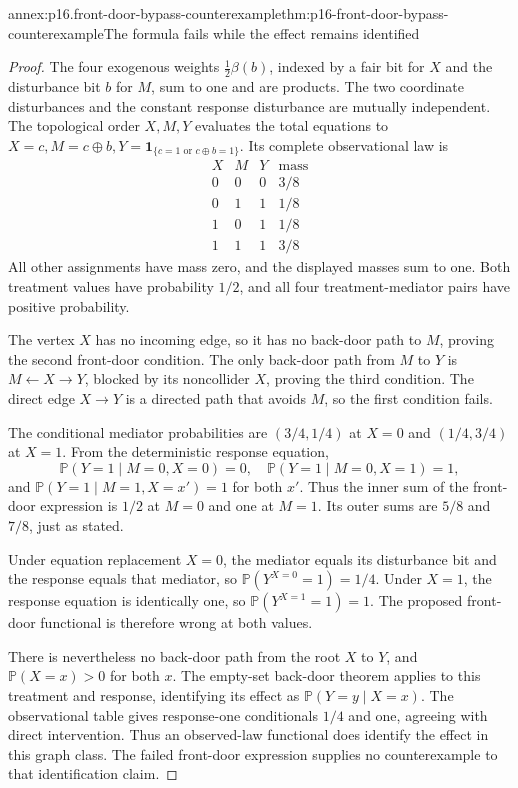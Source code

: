 \begin{annexitem}{annex:p16.front-door-bypass-counterexample}{thm:p16-front-door-bypass-counterexample}{The formula fails while the effect remains identified}
\begin{proof}
The four exogenous weights \(\frac12\beta(b)\), indexed by a
fair bit for \(X\) and the disturbance bit \(b\) for \(M\),
sum to one and are products. The two coordinate disturbances and
the constant response disturbance are mutually independent. The
topological order \(X,M,Y\) evaluates the total equations to
\(X=c,M=c\oplus b,Y=\mathbf1_{\{c=1\text{ or }c\oplus b=1\}}\).
Its complete observational law is
\[
\begin{array}{ccc|c}
 X&M&Y&\text{mass}\\\hline
 0&0&0&3/8\\
 0&1&1&1/8\\
 1&0&1&1/8\\
 1&1&1&3/8
\end{array}
\]
All other assignments have mass zero, and the displayed masses sum
to one. Both treatment values have probability \(1/2\), and all
four treatment-mediator pairs have positive probability.

The vertex \(X\) has no incoming edge, so it has no back-door
path to \(M\), proving the second front-door condition. The only
back-door path from \(M\) to \(Y\) is \(M\leftarrow X\to Y\),
blocked by its noncollider \(X\), proving the third condition.
The direct edge \(X\to Y\) is a directed path that avoids
\(M\), so the first condition fails.

The conditional mediator probabilities are \((3/4,1/4)\) at
\(X=0\) and \((1/4,3/4)\) at \(X=1\). From the deterministic
response equation,
\[
 \mathbb P(Y=1\mid M=0,X=0)=0,\quad
 \mathbb P(Y=1\mid M=0,X=1)=1,
\]
and \(\mathbb P(Y=1\mid M=1,X=x')=1\) for both \(x'\).
Thus the inner sum of the front-door expression is \(1/2\) at
\(M=0\) and one at \(M=1\). Its outer sums are \(5/8\) and
\(7/8\), just as stated.

Under equation replacement \(X=0\), the mediator equals its
disturbance bit and the response equals that mediator, so
\(\mathbb P(Y^{X=0}=1)=1/4\). Under \(X=1\), the response
equation is identically one, so \(\mathbb P(Y^{X=1}=1)=1\).
The proposed front-door functional is therefore wrong at both values.

There is nevertheless no back-door path from the root \(X\) to
\(Y\), and \(\mathbb P(X=x)>0\) for both \(x\). The
empty-set back-door theorem applies to this treatment and response,
identifying its effect as \(\mathbb P(Y=y\mid X=x)\). The
observational table gives response-one conditionals \(1/4\) and
one, agreeing with direct intervention. Thus an observed-law functional
does identify the effect in this graph class. The failed front-door
expression supplies no counterexample to that identification claim.
\end{proof}
\end{annexitem}

